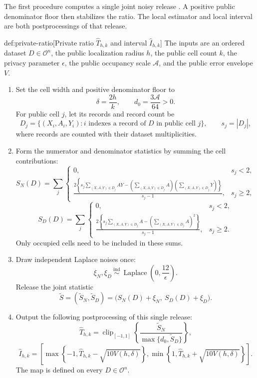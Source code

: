 The first procedure computes a single joint noisy release . A positive public denominator floor  then stabilizes the ratio. The local estimator  and local interval  are both postprocessings of that release.
\begin{algorithmv}{def:private-ratio}[Private ratio \(\widehat T_{h,k}\) and interval \(\widehat I_{h,k}\)]
The inputs are an ordered dataset \(D\in\mathcal O^n\), the public localization radius \(h\), the public cell count \(k\), the privacy parameter \(\epsilon\), the public occupancy scale \(\mathcal A\), and the public error envelope \(V\).
\begin{enumerate}
\item Set the cell width and positive denominator floor to
\[
\delta=\frac{2h}{k},
\qquad
d_0=\frac{3\mathcal A}{64}>0.
\]
For public cell \(j\), let its records and record count be
\[
D_j=\{(X_i,A_i,Y_i):i\text{ indexes a record of }D
\text{ in public cell }j\},
\qquad
s_j=|D_j|,
\]
where records are counted with their dataset multiplicities.

\item Form the numerator and denominator statistics by summing the cell contributions:
\[
S_N(D)=
\sum_j
\begin{cases}
0,&s_j<2,\\[2pt]
\displaystyle
\frac{2\left\{
s_j\sum_{(X,A,Y)\in D_j}AY
-\left(\sum_{(X,A,Y)\in D_j}A\right)
 \left(\sum_{(X,A,Y)\in D_j}Y\right)
\right\}}{s_j-1},&s_j\ge2,
\end{cases}
\]
\[
S_D(D)=
\sum_j
\begin{cases}
0,&s_j<2,\\[2pt]
\displaystyle
\frac{2\left\{
s_j\sum_{(X,A,Y)\in D_j}A
-\left(\sum_{(X,A,Y)\in D_j}A\right)^2
\right\}}{s_j-1},&s_j\ge2.
\end{cases}
\]
Only occupied cells need to be included in these sums.

\item Draw independent Laplace noises once:
\[
\xi_N,\xi_D\ \stackrel{\mathrm{ind}}{\sim}\
\operatorname{Laplace}\!\left(0,\frac{12}{\epsilon}\right).
\]
Release the joint statistic
\[
\widetilde S
=
(\widetilde S_N,\widetilde S_D)
=
\bigl(S_N(D)+\xi_N,\ S_D(D)+\xi_D\bigr).
\]

\item Output the following postprocessing of this single release:
\[
\widehat T_{h,k}
=
\operatorname{clip}_{[-1,1]}
\left\{
\frac{\widetilde S_N}
{\max\{d_0,\widetilde S_D\}}
\right\},
\]
\[
\widehat I_{h,k}
=
\left[
\max\left\{-1,\widehat T_{h,k}-\sqrt{10V(h,\delta)}\right\},
\min\left\{1,\widehat T_{h,k}+\sqrt{10V(h,\delta)}\right\}
\right].
\]
The map is defined on every \(D\in\mathcal O^n\).
\end{enumerate}
\end{algorithmv}

